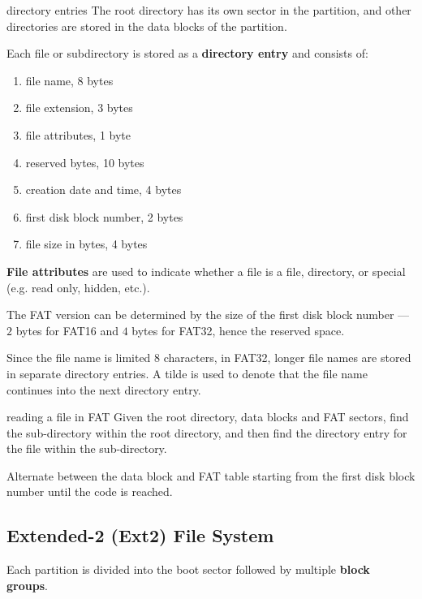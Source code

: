 \begin{defn}{directory entries}
    The root directory has its own sector in the partition, and other directories are stored in the data blocks of the partition.

    Each file or subdirectory is stored as a \textbf{directory entry} and consists of:
    \begin{enumerate}
        \item file name, 8 bytes
        \item file extension, 3 bytes
        \item file attributes, 1 byte
        \item reserved bytes, 10 bytes
        \item creation date and time, 4 bytes
        \item first disk block number, 2 bytes
        \item file size in bytes, 4 bytes
    \end{enumerate}

    \textbf{File attributes} are used to indicate whether a file is a file, directory, or special (e.g. read only, hidden, etc.).

    The FAT version can be determined by the size of the first disk block number --- $2$ bytes for FAT16 and $4$ bytes for FAT32, hence the reserved space.
\end{defn}

Since the file name is limited 8 characters, in FAT32, longer file names are stored in separate directory entries. A tilde is used to denote that the file name continues into the next directory entry.

\begin{defn}{reading a file in FAT}
    Given the root directory, data blocks and FAT sectors, find the sub-directory within the root directory, and then find the directory entry for the file within the sub-directory.

    Alternate between the data block and FAT table starting from the first disk block number until the  code is reached.
\end{defn}


\subsection{Extended-2 (Ext2) File System}
Each partition is divided into the boot sector followed by multiple \textbf{block groups}.

